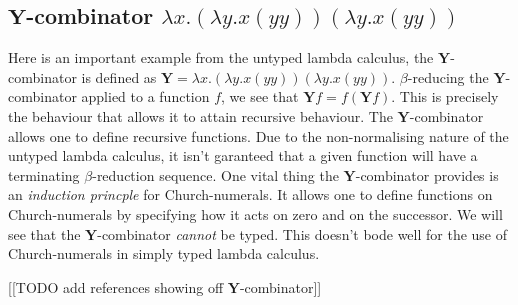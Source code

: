 \begin{example}
\begin{example}
\end{example}





\subsection{$\mathbf{Y}$-combinator $\lambda x . (\lambda y . x (y y)) (\lambda y . x (y y))$} %

Here is an important example from the untyped lambda calculus, the $\mathbf{Y}$-combinator is defined as $\mathbf{Y} = \lambda x . (\lambda y . x (y y)) (\lambda y . x (y y))$.
$\beta$-reducing the $\mathbf{Y}$-combinator applied to a function $f$, we see that $\mathbf{Y}f = f (\mathbf{Y} f)$. This is precisely the behaviour that allows it to attain recursive behaviour.
The $\mathbf{Y}$-combinator allows one to define recursive functions. Due to the non-normalising nature of the untyped lambda calculus, it isn't garanteed that a given function will have a terminating $\beta$-reduction sequence.
One vital thing the $\mathbf{Y}$-combinator provides is an \emph{induction princple} for Church-numerals. It allows one to define functions on Church-numerals by specifying how it acts on zero and on the successor.
We will see that the $\mathbf{Y}$-combinator \emph{cannot} be typed. This doesn't bode well for the use of Church-numerals in simply typed lambda calculus.

[[TODO add references showing off $\mathbf{Y}$-combinator]]


\end{example}
